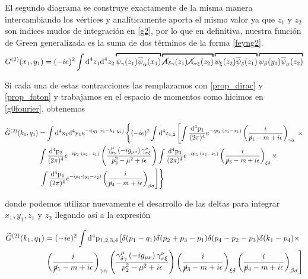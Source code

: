 \documentclass{article}
\numberwithin{equation}{section}
\begin{document}
El segundo diagrama se construye exactamente de la misma manera intercambiando
los vértices y analíticamente aporta el mismo valor ya que $ z_1 $ y $ z_2 $ son indices mudos de integración en \ref{g2}, por lo que en
definitiva, nuestra función de Green generalizada es la suma de dos
términos de la forma \ref{feyng2}.
\begin{equation}
G^{(2)}(x_{1},y_{1})=(-ie)^{2}\int \mathrm{d^4}z_{1}\mathrm{d^4}z_{2}\overbracket{\psi_{\gamma}(z_{1})\overline{\psi}_{\alpha}(x_{1})}\overbracket{\cancel{A}_{\delta\gamma}(z_{1})\cancel{A}_{\sigma\xi}(z_{2})}\overbracket{\psi_{\xi}(z_{2})\overline{\psi}_{\delta}(z_{1})}\overbracket{\psi_{\beta}(y_{1})\overline{\psi}_{\sigma}(z_{2})}
\end{equation}

Si cada una de estas contracciones las remplazamos con \ref{prop_dirac} y \ref{prop_foton} y trabajamos
en el espacio de momentos como hicimos en \ref{g0fourier}, obtenemos

\begin{equation}\label{key}
\begin{aligned}
\widetilde{G}^{(2)}(k_{1},q_{1})&=\int \mathrm{d^4x_1}\mathrm{d^4y_1} e^{-i (q_1 \cdot x_1-k_1 \cdot y_1)} \left\{  (-ie)^{2}\int \mathrm{\mathrm{d^4}z_{1,2}}  \left[  \int\frac{\mathrm{\mathrm{d^4}p_1}}{(2\pi)^{4}}e^{-ip_1\cdot(z_{1}-x_{1})}\left(\frac{i}{\cancel{p}_1-m+i\epsilon}\right)_{\gamma\alpha} \right. \right. \times \\ &\int\frac{\mathrm{\mathrm{d^4}p_2}}{(2\pi)^{4}}e^{-ip_2\cdot(z_2-z_1)}\left(\frac{\gamma_{\delta\gamma}^{\mu} \left(-ig_{\mu\nu}\right) \gamma_{\sigma\xi}^{\nu}}{p^2_2 -\mu^2 +i\epsilon}\right) \int\frac{\mathrm{\mathrm{d^4}p_3}}{(2\pi)^{4}}e^{-ip_3\cdot(z_{2}-z_{1})}\left(\frac{i}{\cancel{p}_3-m+i\epsilon}\right)_{\xi\delta} \times \\
& \left. \left. \int\frac{\mathrm{\mathrm{d^4}p_4}}{(2\pi)^{4}}e^{-ip_4\cdot(y_{1}-z_{2})}\left(\frac{i}{\cancel{p}_4-m+i\epsilon}\right)_{\beta\sigma}  \right]  \right\}
\end{aligned}
\end{equation}

donde podemos utilizar nuevamente el desarrollo de las deltas para integrar $ x_1, y_1, z_1 $ y $ z_2 $  llegando así a la expresión

\begin{equation}\label{key}
\begin{aligned}
\widetilde{G}^{(2)}(k_{1},q_{1})&=(-ie)^{2} \int \mathrm{\mathrm{d^4}p_{1,2,3,4}}  \left[  \delta (p_1 -q_1) \delta(p_2 + p_3 - p_1) \delta (p_4 - p_2 - p_3) \delta (k_1 - p_4) \times \right.\\
& \left. \left(\frac{i}{\cancel{p}_1-m+i\epsilon}\right)_{\gamma\alpha} \left(\frac{\gamma_{\delta\gamma}^{\mu} \left(-ig_{\mu\nu}\right) \gamma_{\sigma\xi}^{\nu}}{p^2_2 -\mu^2 +i\epsilon}\right) \left(\frac{i}{\cancel{p}_3-m+i\epsilon}\right)_{\xi\delta} \left(\frac{i}{\cancel{p}_4-m+i\epsilon}\right)_{\beta\sigma}  \right] 
\end{aligned}
\end{equation}
\end{document}
